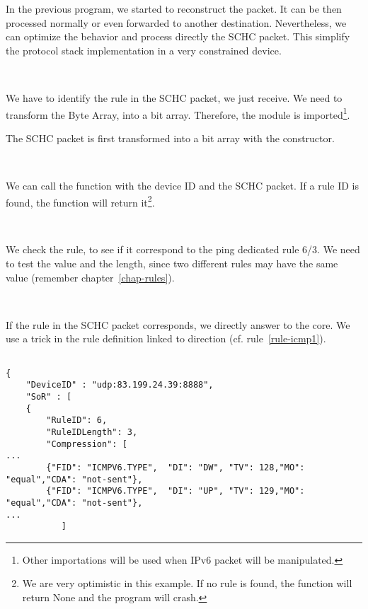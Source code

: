 In the previous program, we started to reconstruct the packet. It can be then processed normally or even forwarded to another destination. Nevertheless, we can optimize the behavior and process directly the SCHC packet. This simplify the protocol stack implementation in a very constrained device. 

~~


We have to identify the rule in the SCHC packet, we just receive. We need to transform the Byte Array, into a bit array. Therefore, the  module is imported\footnote{Other importations will be used when IPv6 packet will be manipulated.}.


The SCHC packet is first transformed into a bit array with the  constructor. 

~~

We can call the function  with the device ID and the SCHC packet. If a rule ID is found, the function will return it\footnote{We are very optimistic in this example. If no rule is found, the function will return None and the program will crash.}.

~~~

We check the rule, to see if it correspond to the ping dedicated rule 6/3. We need to test the value and the length, since two different rules may have the same value (remember chapter~\vref{chap-rules}).

~~~

If the rule in the SCHC packet corresponds, we directly answer to the core. We use a trick in the rule definition linked to direction (cf. rule~\vref{rule-icmp1}). 

\begin{lstlisting}[basicstyle=\ttfamily\tiny, caption={extract from rule 6/3 for ping traffic}, backgroundcolor=\color{yellow}]

{
    "DeviceID" : "udp:83.199.24.39:8888",
    "SoR" : [
	{
	    "RuleID": 6,
	    "RuleIDLength": 3,
	    "Compression": [
...
		{"FID": "ICMPV6.TYPE",  "DI": "DW", "TV": 128,"MO": "equal","CDA": "not-sent"},
		{"FID": "ICMPV6.TYPE",  "DI": "UP", "TV": 129,"MO": "equal","CDA": "not-sent"},
...
	       ]

\end{lstlisting}

